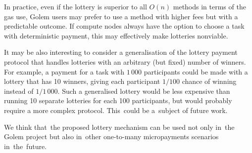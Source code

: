 \documentclass[a4paper]{article}
\begin{document}
    In practice, even if the lottery is superior to all $O(n)$ methods in terms of the gas use, Golem users
    may prefer to use a method with higher fees but with a predictable outcome. If compute nodes always have
    the option to choose a task with deterministic payment, this may effectively make lotteries nonviable.

    It may be also interesting to consider a generalisation of the lottery payment protocol that handles
    lotteries with an arbitrary (but fixed) number of winners. For example, a payment for a task with $1\,000$
    participants could be made with a lottery that has 10 winners, giving each participant $1 / 100$ chance
    of winning instead of $1 / 1\,000$. Such a generalised lottery would be less expensive than running 10
    separate lotteries for each 100 participants, but would probably require a more complex protocol. This~could
    be a~subject of future work.
    

    We think that~the proposed lottery mechanism can be used not only in~the Golem project but also in~other
    one-to-many micropayments scenarios in~the~future.
\end{document}
